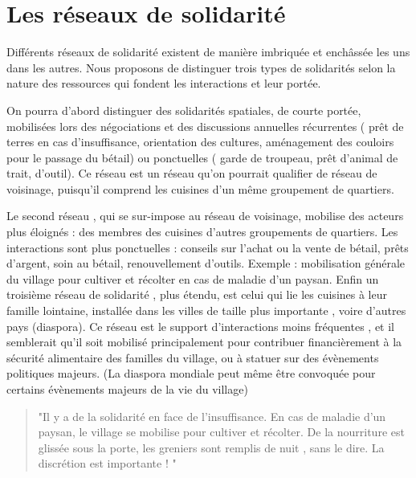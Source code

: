 \section{Les réseaux de solidarité}

%
%
%

Différents réseaux de solidarité existent de manière imbriquée et enchâssée les uns dans les autres. Nous proposons de distinguer trois types de solidarités selon la nature des ressources qui fondent les interactions et leur portée.

On pourra d'abord distinguer des solidarités spatiales, de courte portée,  mobilisées lors des négociations et des discussions annuelles récurrentes ( prêt de terres en cas d'insuffisance, orientation des cultures, aménagement des couloirs pour le passage du bétail) ou ponctuelles ( garde de troupeau, prêt d'animal de trait, d'outil).
Ce réseau est un réseau qu'on pourrait qualifier de réseau de  voisinage, puisqu'il comprend les cuisines d'un même groupement de quartiers.

Le second réseau , qui se sur-impose au réseau de voisinage,  mobilise des acteurs plus éloignés : des  membres des cuisines d'autres groupements de quartiers.
Les interactions sont plus ponctuelles : conseils sur l'achat ou la vente de bétail, prêts d'argent, soin au bétail, renouvellement d'outils. Exemple : mobilisation générale du village pour cultiver et récolter en cas de maladie d'un paysan.
Enfin un troisième réseau de solidarité , plus étendu, est celui qui lie les cuisines à leur famille lointaine, installée dans les villes  de taille plus importante , voire d'autres pays (diaspora).
Ce réseau est le support d'interactions  moins fréquentes , et il semblerait qu'il soit mobilisé principalement pour contribuer financièrement à la sécurité alimentaire des familles du village, ou à statuer sur des évènements politiques majeurs. (La diaspora mondiale peut même être convoquée pour certains évènements majeurs de la vie du village)

\begin{quote}
  "Il y a de la solidarité en face de l’insuffisance. En cas de maladie d’un paysan, le village se mobilise pour cultiver et récolter. De la nourriture est glissée sous la porte, les greniers sont remplis de nuit , sans le dire. La discrétion est importante ! "
\end{quote}
